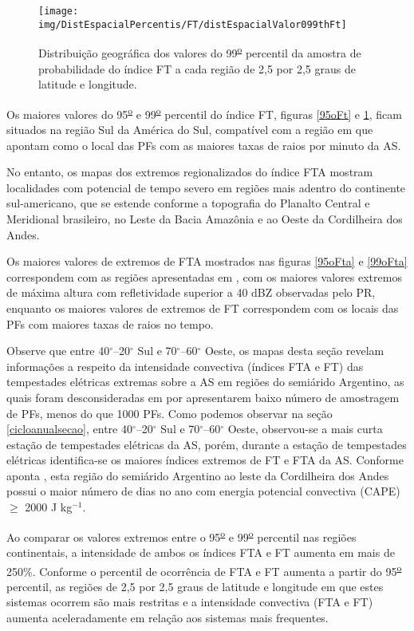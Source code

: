 \begin{figure}[!ht]
\centering  
{\texttt{[image: img/DistEspacialPercentis/FT/distEspacialValor099thFt]}}
\caption{Distribuição geográfica dos valores do  99\textsuperscript{\underline{o}} percentil da amostra de probabilidade do índice FT a cada região de 2,5 por 2,5 graus de latitude e longitude.}
\label{99oFt}
\end{figure}

Os maiores valores do 95\textsuperscript{\underline{o}} e 99\textsuperscript{\underline{o}} percentil do índice FT, figuras \ref{95oFt} e \ref{99oFt},  ficam situados na região Sul da América do Sul, compatível com a região em que  apontam como o local das PFs com as maiores taxas de raios por minuto da AS.

No entanto, os mapas dos extremos regionalizados do índice FTA mostram localidades com potencial de tempo severo em regiões mais adentro do continente sul-americano, que se estende conforme a topografia do Planalto Central e Meridional brasileiro, no Leste da Bacia Amazônia e ao Oeste da Cordilheira dos Andes. 

Os maiores valores de extremos de FTA mostrados nas figuras \ref{95oFta} e \ref{99oFta} correspondem com as regiões apresentadas em , com os maiores valores extremos de máxima altura com refletividade superior a 40 dBZ observadas pelo PR, enquanto os maiores valores de extremos de FT correspondem com os locais das PFs com maiores taxas de raios no tempo.

Observe que entre 40$^{\circ}$--20$^{\circ}$ Sul e 70$^{\circ}$--60$^{\circ}$ Oeste, os mapas desta seção revelam informações a respeito da intensidade convectiva (índices FTA e FT) das tempestades elétricas extremas sobre a AS em regiões do semiárido Argentino, as quais foram desconsideradas em  por apresentarem baixo número de amostragem de PFs, menos do que 1000 PFs. Como podemos observar na seção \ref{cicloanualsecao}, entre 40$^{\circ}$--20$^{\circ}$ Sul e 70$^{\circ}$--60$^{\circ}$ Oeste, observou-se a mais curta estação de tempestades elétricas da AS, porém, durante a estação de tempestades elétricas identifica-se os maiores índices extremos de FT e FTA da AS. Conforme aponta , esta região do semiárido Argentino ao leste da Cordilheira dos Andes possui o maior número de dias no ano com energia potencial convectiva (CAPE) $\geq$ 2000 J kg$^{-1}$. 


Ao comparar os valores extremos entre o 95\textsuperscript{\underline{o}} e 99\textsuperscript{\underline{o}} percentil nas regiões continentais, a intensidade de ambos os índices FTA e FT aumenta em mais de 250\%. Conforme o percentil de ocorrência de FTA e FT aumenta a partir do 95\textsuperscript{\underline{o}} percentil, as regiões de 2,5 por 2,5 graus de latitude e longitude em que estes sistemas ocorrem são mais restritas e a intensidade convectiva (FTA e FT) aumenta aceleradamente em relação aos sistemas mais frequentes.
